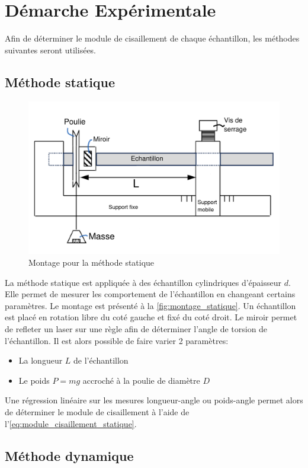 \section{Démarche Expérimentale}

Afin de déterminer le module de cisaillement de chaque échantillon, les méthodes suivantes seront utilisées.

\subsection{Méthode statique}

\begin{figure}[h]
    \centering
    \includegraphics[width=0.6\linewidth]{figures/statique_annotated.png}
    \caption{Montage pour la méthode statique \cite{notice}}
    \label{fig:montage_statique}
\end{figure}

La méthode statique est appliquée à des échantillon cylindriques d'épaisseur $d$. Elle permet de mesurer les comportement de l'échantillon en changeant certains paramètres. Le montage est présenté à la \autoref{fig:montage_statique}. Un échantillon est placé en rotation libre du coté gauche et fixé du coté droit. Le miroir permet de refleter un laser sur une règle afin de déterminer l'angle de torsion de l'échantillon. Il est alors possible de faire varier 2 paramètres:
\begin{itemize}
    \item La longueur $L$ de l'échantillon
    \item Le poids $P=mg$ accroché à la poulie de diamètre $D$
\end{itemize}
Une régression linéaire sur les mesures longueur-angle ou poids-angle permet alors de déterminer le module de cisaillement à l'aide de l'\autoref{eq:module_cisaillement_statique}.

\subsection{Méthode dynamique}

